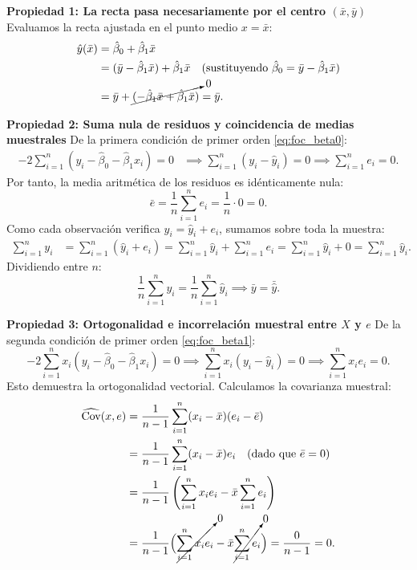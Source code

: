 \documentclass[11pt,a4paper]{article}
\begin{document}
\begin{demobox}
\textbf{Propiedad 1: La recta pasa necesariamente por el centro $(\bar{x}, \bar{y})$}  
Evaluamos la recta ajustada en el punto medio $x = \bar{x}$:
\begin{align}
\hat{y}(\bar{x}) &= \hat{\beta}_0 + \hat{\beta}_1 \bar{x} \\
&= (\bar{y} - \hat{\beta}_1 \bar{x}) + \hat{\beta}_1 \bar{x} \quad (\text{sustituyendo } \hat{\beta}_0 = \bar{y} - \hat{\beta}_1 \bar{x}) \\
&= \bar{y} + \cancelto{0}{(-\hat{\beta}_1 \bar{x} + \hat{\beta}_1 \bar{x})} = \bar{y}.
\end{align}

\textbf{Propiedad 2: Suma nula de residuos y coincidencia de medias muestrales}  
De la primera condición de primer orden \eqref{eq:foc_beta0}:
\begin{align}
-2 \sum_{i=1}^n (y_i - \hat{\beta}_0 - \hat{\beta}_1 x_i) = 0 &\implies \sum_{i=1}^n (y_i - \hat{y}_i) = 0 \implies \sum_{i=1}^n e_i = 0.
\end{align}
Por tanto, la media aritmética de los residuos es idénticamente nula:
\begin{equation}
\bar{e} = \frac{1}{n}\sum_{i=1}^n e_i = \frac{1}{n} \cdot 0 = 0.
\end{equation}
Como cada observación verifica $y_i = \hat{y}_i + e_i$, sumamos sobre toda la muestra:
\begin{align}
\sum_{i=1}^n y_i &= \sum_{i=1}^n (\hat{y}_i + e_i) = \sum_{i=1}^n \hat{y}_i + \sum_{i=1}^n e_i = \sum_{i=1}^n \hat{y}_i + 0 = \sum_{i=1}^n \hat{y}_i.
\end{align}
Dividiendo entre $n$:
\begin{equation}
\frac{1}{n}\sum_{i=1}^n y_i = \frac{1}{n}\sum_{i=1}^n \hat{y}_i \implies \bar{y} = \bar{\hat{y}}.
\end{equation}

\textbf{Propiedad 3: Ortogonalidad e incorrelación muestral entre $X$ y $e$}  
De la segunda condición de primer orden \eqref{eq:foc_beta1}:
\begin{equation}
-2 \sum_{i=1}^n x_i (y_i - \hat{\beta}_0 - \hat{\beta}_1 x_i) = 0 \implies \sum_{i=1}^n x_i (y_i - \hat{y}_i) = 0 \implies \sum_{i=1}^n x_i e_i = 0.
\end{equation}
Esto demuestra la ortogonalidad vectorial. Calculamos la covarianza muestral:
\begin{align}
\widehat{\operatorname{Cov}}(x, e) &= \frac{1}{n-1}\sum_{i=1}^n (x_i - \bar{x})(e_i - \bar{e}) \\
&= \frac{1}{n-1}\sum_{i=1}^n (x_i - \bar{x})e_i \quad (\text{dado que } \bar{e} = 0) \\
&= \frac{1}{n-1}\left( \sum_{i=1}^n x_i e_i - \bar{x}\sum_{i=1}^n e_i \right) \\
&= \frac{1}{n-1}\Big( \cancelto{0}{\sum_{i=1}^n x_i e_i} - \bar{x}\cancelto{0}{\sum_{i=1}^n e_i} \Big) = \frac{0}{n-1} = 0.
\end{align}


\end{demobox}
\end{document}
